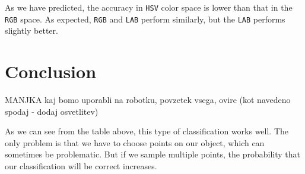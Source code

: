 \documentclass[12pt,a4paper]{article}
\begin{document}
	As we have predicted, the accuracy in \texttt{HSV} color space is lower than that in the \texttt{RGB} space. As expected, \texttt{RGB} and \texttt{LAB} perform similarly, but the \texttt{LAB} performs slightly better. \\
	
	

	
	\section{Conclusion}

	MANJKA kaj bomo uporabli na robotku, povzetek vsega, ovire (kot navedeno spodaj - dodaj osvetlitev)
	
	As we can see from the table above, this type of classification works well. The only problem is that we have to choose points on our object, which can sometimes be problematic. But if we sample multiple points, the probability that our classification will be correct increases.
	
	
\end{document}
